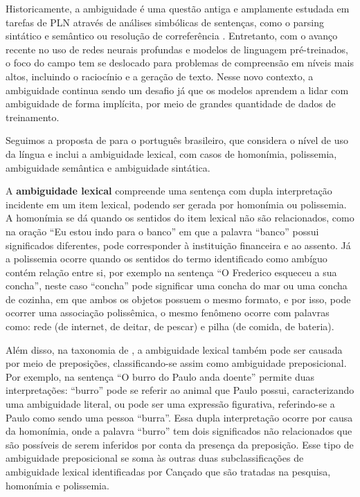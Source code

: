 Historicamente, a ambiguidade é uma questão antiga e amplamente estudada em tarefas de PLN através de análises simbólicas de sentenças, como o parsing sintático e semântico \cite{church1982,koller2008} ou resolução de correferência \cite{poesio2005}. Entretanto, com o avanço recente no uso de redes neurais profundas e modelos de linguagem pré-treinados, o foco do campo tem se deslocado para problemas de compreensão em níveis mais altos, incluindo o raciocínio e a geração de texto. Nesse novo contexto, a ambiguidade continua sendo um desafio já que os modelos aprendem a lidar com ambiguidade de forma implícita, por meio de grandes quantidade de dados de treinamento.

Seguimos a proposta de \textcite{canccado2005manual} para o português brasileiro, que considera o nível de uso da língua e inclui a ambiguidade lexical, com casos de homonímia, polissemia, ambiguidade semântica e ambiguidade sintática.

A \textbf{ambiguidade lexical} compreende uma sentença com  dupla interpretação incidente em um item lexical, podendo ser gerada por homonímia ou polissemia. A homonímia se dá quando os sentidos do item lexical não são relacionados, como na oração ``Eu estou indo para o banco'' em que a palavra ``banco'' possui significados diferentes, pode corresponder à instituição financeira e ao assento. Já a polissemia ocorre quando os sentidos do termo identificado como ambíguo contém relação entre si, por exemplo na sentença ``O Frederico esqueceu a sua concha'', neste caso ``concha'' pode significar uma concha do mar ou uma concha de cozinha, em que ambos os objetos possuem o mesmo formato, e por isso, pode ocorrer uma associação polissêmica, o mesmo fenômeno ocorre com palavras como: rede (de internet, de deitar, de pescar) e pilha (de comida, de bateria).

Além disso, na taxonomia de \textcite{canccado2005manual}, a ambiguidade lexical também pode ser causada por meio de preposições, classificando-se assim como ambiguidade preposicional. Por exemplo, na sentença \enquote{O burro do Paulo anda doente} permite duas interpretações: \enquote{burro} pode se referir ao animal que Paulo possui, caracterizando uma ambiguidade literal, ou pode ser uma expressão figurativa, referindo-se a Paulo como sendo uma pessoa \enquote{burra}. Essa dupla interpretação ocorre por causa da homonímia, onde a palavra \enquote{burro} tem dois significados não relacionados que são possíveis de serem inferidos por conta da presença da preposição. Esse tipo de ambiguidade preposicional se soma às outras duas subclassificações de ambiguidade lexical identificadas por Cançado que são tratadas na pesquisa, homonímia e polissemia.

